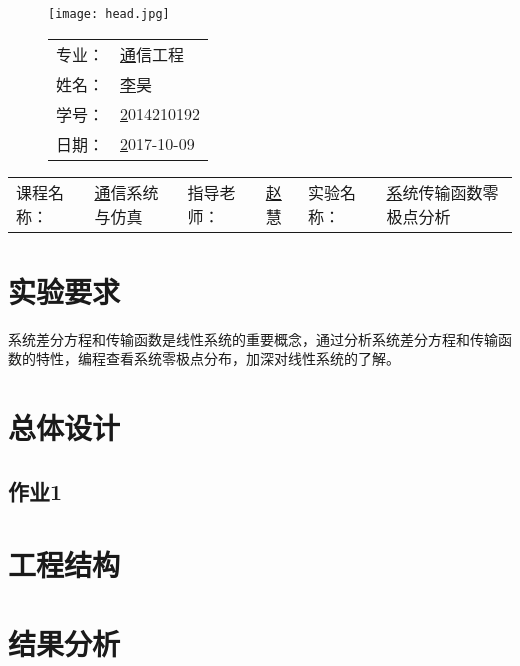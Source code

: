 \documentclass{zjureport}
\newcommand{\major}{通信工程}
\newcommand{\name}{李昊}
\newcommand{\stuid}{2014210192}
\newcommand{\newdate}{2017-10-09}
\newcommand{\course}{通信系统与仿真}
\newcommand{\tutor}{赵慧}
\newcommand{\newtitle}{系统传输函数零极点分析}
\begin{document}
\thispagestyle{empty}
\begin{figure}[h]
  \begin{minipage}{0.6\linewidth}
    \centerline{\texttt{[image: head.jpg]}}
  \end{minipage}
  \hfill
  \begin{minipage}{.4\linewidth}
    \raggedleft
    \begin{tabular*}{.8\linewidth}{ll}
      专业： & \underline\major   \\
      姓名： & \underline\name    \\
      学号： & \underline\stuid   \\
      日期： & \underline\newdate \\
    \end{tabular*}
  \end{minipage}
\end{figure}

\begin{table}[!htbp]
  \centering
  \begin{tabular*}{\linewidth}{llllll}
    课程名称： & \underline\course   & 指导老师： & \underline\tutor   & 实验名称：       &  \underline\newtitle\\
  \end{tabular*}
\end{table}


\section{实验要求}
  系统差分方程和传输函数是线性系统的重要概念，通过分析系统差分方程和传输函数的特性，编程查看系统零极点分布，加深对线性系统的了解。
\section{总体设计}
  \subsection{作业1}

\section{工程结构}
    


\section{结果分析}
\end{document}
